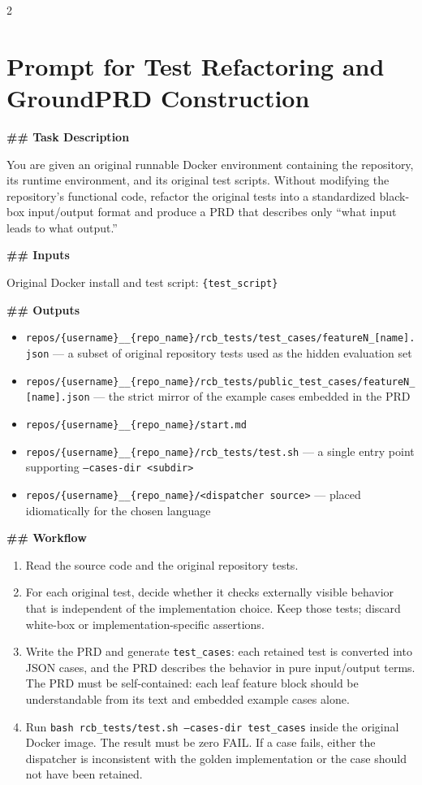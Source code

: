 \begin{multicols}{2}
\section{Prompt for Test Refactoring and GroundPRD Construction}
\label{appendix:task1-prompt}
\end{multicols}

\begin{promptbox}
\textbf{\#\# Task Description}

You are given an original runnable Docker environment containing the repository, its runtime environment, and its original test scripts. Without modifying the repository's functional code, refactor the original tests into a standardized black-box input/output format and produce a PRD that describes only ``what input leads to what output.''

\textbf{\#\# Inputs}

Original Docker install and test script: \texttt{\{test\_script\}}

\textbf{\#\# Outputs}
\begin{itemize}
\item \texttt{repos/\{username\}\_\_\{repo\_name\}/rcb\_tests/test\_cases/featureN\_[name].json} --- a subset of original repository tests used as the hidden evaluation set
\item \texttt{repos/\{username\}\_\_\{repo\_name\}/rcb\_tests/public\_test\_cases/featureN\_[name].json} --- the strict mirror of the example cases embedded in the PRD
\item \texttt{repos/\{username\}\_\_\{repo\_name\}/start.md}
\item \texttt{repos/\{username\}\_\_\{repo\_name\}/rcb\_tests/test.sh} --- a single entry point supporting \texttt{--cases-dir <subdir>}
\item \texttt{repos/\{username\}\_\_\{repo\_name\}/<dispatcher source>} --- placed idiomatically for the chosen language
\end{itemize}

\textbf{\#\# Workflow}
\begin{enumerate}
\item Read the source code and the original repository tests.
\item For each original test, decide whether it checks externally visible behavior that is independent of the implementation choice. Keep those tests; discard white-box or implementation-specific assertions.
\item Write the PRD and generate \texttt{test\_cases}: each retained test is converted into JSON cases, and the PRD describes the behavior in pure input/output terms. The PRD must be self-contained: each leaf feature block should be understandable from its text and embedded example cases alone.
\item Run \texttt{bash rcb\_tests/test.sh --cases-dir test\_cases} inside the original Docker image. The result must be zero FAIL. If a case fails, either the dispatcher is inconsistent with the golden implementation or the case should not have been retained.
\end{enumerate}


\end{promptbox}
